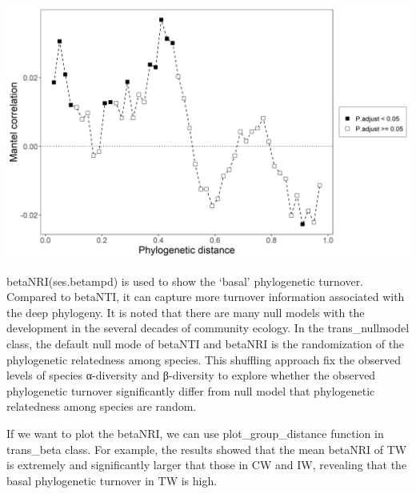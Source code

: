\documentclass[
]{book}
\newenvironment{Shaded}{\begin{snugshade}}{\end{snugshade}}
\newcommand{\AttributeTok}[1]{\textcolor[rgb]{0.77,0.63,0.00}{#1}}
\newcommand{\CommentTok}[1]{\textcolor[rgb]{0.56,0.35,0.01}{\textit{#1}}}
\newcommand{\ConstantTok}[1]{\textcolor[rgb]{0.00,0.00,0.00}{#1}}
\newcommand{\DecValTok}[1]{\textcolor[rgb]{0.00,0.00,0.81}{#1}}
\newcommand{\FunctionTok}[1]{\textcolor[rgb]{0.00,0.00,0.00}{#1}}
\newcommand{\NormalTok}[1]{#1}
\newcommand{\SpecialCharTok}[1]{\textcolor[rgb]{0.00,0.00,0.00}{#1}}
\begin{document}
\begin{center}\includegraphics[width=600px]{Images/trans_nullmodel_mantel_corr} \end{center}

betaNRI(ses.betampd) is used to show the `basal' phylogenetic turnover.
Compared to betaNTI, it can capture more turnover information associated with the deep phylogeny.
It is noted that there are many null models with the development in the several decades of community ecology.
In the trans\_nullmodel class,
the default null mode of betaNTI and betaNRI is the randomization of the phylogenetic relatedness among species.
This shuffling approach fix the observed levels of species α-diversity and β-diversity to
explore whether the observed phylogenetic turnover significantly differ from null model that phylogenetic relatedness among species are random.

\begin{Shaded}
\end{Shaded}

If we want to plot the betaNRI, we can use plot\_group\_distance function in trans\_beta class.
For example, the results showed that the mean betaNRI of TW is extremely and significantly larger that those in CW and IW,
revealing that the basal phylogenetic turnover in TW is high.
\end{document}
